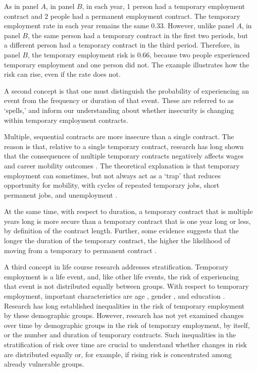 \documentclass[12pt]{article}
\begin{document}
As in panel $A$, in panel $B$, in each year, 1 person had a temporary employment contract and 2 people had a permanent employment contract.  The temporary employment rate in each year remains the same 0.33.  However, unlike panel $A$, in panel $B$, the same person had a temporary contract in the first two periods, but a different person had a temporary contract in the third period.  Therefore, in panel $B$, the temporary employment risk is 0.66, because two people experienced temporary employment and one person did not.  The example illustrates how the risk can rise, even if the rate does not.

A second concept is that one must distinguish the probability of experiencing an event from the frequency or duration of that event.  These are referred to as `spells,' and inform our understanding about whether insecurity is changing within temporary employment contracts.  

Multiple, sequential contracts are more insecure than a single contract.  The reason is that, relative to a single temporary contract, research has long shown that the consequences of multiple temporary contracts negatively affects wages and career mobility outcomes \citep{booth_etal_2002,mertens_mcginnity_2004}.  The theoretical explanation is that temporary employment can sometimes, but not always act as a `trap' that reduces opportunity for mobility, with cycles of repeated temporary jobs, short permanent jobs, and unemployment  \citep{fuller_stecy-hildebrandt_2015}.  

At the same time, with respect to duration, a temporary contract that is multiple years long is more secure than a temporary contract that is one year long or less, by definition of the contract length. Further, some evidence suggests that the longer the duration of the temporary contract, the higher the likelihood of moving from a temporary to permanent contract \citep{gagliarducci_2005}.

A third concept in life course research addresses stratification.  Temporary employment is a life event, and, like other life events, the risk of experiencing that event is not distributed equally between groups.  With respect to temporary employment, important characteristics are age \citep{hipp_etal_2015}, gender \citep{gash_mcginnity_2007}, and education \citep{gebel_giesecke_2016}.  Research has long established inequalities in the risk of temporary employment by these demographic groups.  However, research has not yet examined changes over time by demographic groups in the risk of temporary employment, by itself, or the number and duration of temporary contracts.  Such inequalities in the stratification of risk over time are crucial to understand whether changes in risk are distributed equally or, for example, if rising risk is concentrated among already vulnerable groups.
\end{document}
